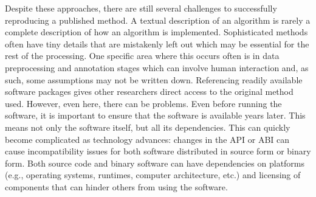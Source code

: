 Despite these approaches, there are still several challenges to successfully
reproducing a published method.
{ %
	A textual description of an algorithm is rarely a complete description of
	how an algorithm is implemented. Sophisticated methods often have tiny details
	that are mistakenly left out which may be essential for the rest of the
	processing. One specific area where this occurs often is
	in data preprocessing and annotation stages which can
	involve human interaction and, as such, some assumptions
	may not be written down.
}
{ %
	Referencing readily available software packages gives
	other researchers direct access to the original method
	used. However, even here, there can be problems.
	Even before running the software, it is important to
	ensure that the
	software is available years later. This means not only the software itself, but
	all its dependencies. This can quickly become complicated as technology
	advances: changes in the \acrfull{API} or \acrfull{ABI}
	can cause incompatibility issues for both software
	distributed in source form or binary form. Both source
	code and binary software can have dependencies on
	platforms (e.g., operating systems, runtimes, computer
	architecture, etc.) and licensing of components that can
	hinder others from using the software.
}

